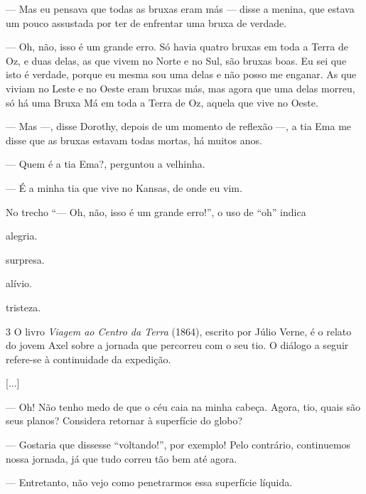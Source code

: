 \begin{conteudo}
\begin{conteudo}
\begin{conteudo}
\begin{conteudo}
\begin{conteudo}
\begin{myquote}
--- Mas eu pensava que todas as bruxas eram más --- disse a menina, que estava um pouco
assustada por ter de enfrentar uma bruxa de verdade. 

--- Oh, não, isso é um grande erro. Só havia quatro bruxas em toda a Terra de Oz, 
e duas delas, as que vivem no Norte e no Sul, são bruxas boas. 
Eu sei que isto é verdade, porque eu mesma sou uma delas e não posso me enganar. 
As que viviam no Leste e no Oeste eram bruxas más, mas agora que uma delas morreu, 
só há uma Bruxa Má em toda a Terra de Oz, aquela que vive no Oeste.

--- Mas ---, disse Dorothy, depois de um momento de reflexão ---, a tia Ema me disse
que as bruxas estavam todas mortas, há muitos anos.

--- Quem é a tia Ema?, perguntou a velhinha.

--- É a minha tia que vive no Kansas, de onde eu vim.

\end{myquote}

No trecho ``--- Oh, não, isso é um grande erro!'', o uso de ``oh'' indica

\begin{escolha}
\item alegria.

\item surpresa.

\item alívio.

\item tristeza.
\end{escolha}

\num{3} O livro \textit{Viagem ao Centro da Terra} (1864), escrito por Júlio Verne, é o relato do jovem Axel sobre a jornada que
percorreu com o seu tio. O diálogo a seguir refere-se à continuidade da expedição.

\begin{myquote}
{[}...{]}

--- Oh! Não tenho medo de que o céu caia na minha cabeça.
Agora, tio, quais são seus planos? Considera retornar à superfície do globo?

--- Gostaria que dissesse ``voltando!'', por exemplo! 
Pelo contrário, continuemos nossa jornada, já que tudo correu tão bem até agora.

--- Entretanto, não vejo como penetrarmos essa superfície líquida.


\end{myquote}
\end{conteudo}
\end{conteudo}
\end{conteudo}
\end{conteudo}
\end{conteudo}
